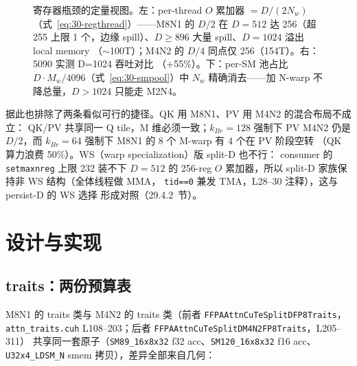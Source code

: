 \begin{figure}[H]
\caption{寄存器瓶颈的定量视图。左：per-thread $O$ 累加器 $=D/(2N_w)$
（式~\ref{eq:30-regthread}）——M8N1 的 $D/2$ 在 $D{=}512$ 达 256（超 255 上限
1 个，边缘 spill）、$D\ge896$ 大量 spill、$D{=}1024$ 溢出 local memory
（$\sim$100T）；M4N2 的 $D/4$ 同点仅 256（154T）。右：5090 实测 D=1024 吞吐对比
（+55\%）。下：per-SM 池占比 $D\cdot M_w/4096$（式~\ref{eq:30-smpool}）中 $N_w$
精确消去——加 N-warp 不降总量，$D{>}1024$ 只能走 M2N4。}
\label{fig:30-reg-pressure}
\end{figure}

据此也排除了两条看似可行的捷径。QK 用 M8N1、PV 用 M4N2 的混合布局不成立：
QK/PV 共享同一 Q tile，M 维必须一致；$k_{Br}=128$ 强制下 PV M4N2 仍是
$D/2$，而 $k_{Br}=64$ 强制下 M8N1 的 8 个 M-warp 有 4 个在 PV 阶段空转
（QK 算力浪费 50\%）。WS（warp specialization）版 split-D 也不行：
consumer 的 \texttt{setmaxnreg} 上限 232 装不下 $D=512$ 的 256-reg $O$
累加器，所以 split-D 家族保持非 WS 结构（全体线程做 MMA，
\texttt{tid==0} 兼发 TMA，L28--30 注释），这与 persist-D 的 WS 选择
形成对照（29.4.2~节）。

\section{设计与实现}

\subsection{traits：两份预算表}

M8N1 的 traits 类与 M4N2 的 traits 类（前者
\texttt{FFPAAttnCuTeSplitDFP8Traits}，\texttt{attn\_traits.cuh}
L108--203；后者 \texttt{FFPAAttnCuTeSplitDM4N2FP8Traits}，L205--311）
共享同一套原子（\texttt{SM89\_16x8x32} f32 acc、\texttt{SM120\_16x8x32}
f16 acc、\texttt{U32x4\_LDSM\_N} smem 拷贝），差异全部来自几何：

